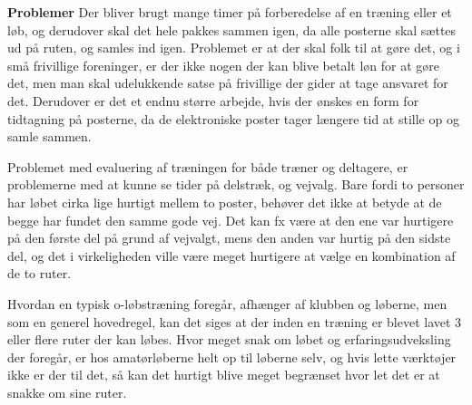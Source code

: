 \textbf{Problemer}\newline
Der bliver brugt mange timer på forberedelse af en træning eller et løb, og derudover skal det hele pakkes sammen igen, da alle posterne skal sættes ud på ruten, og samles ind igen. \newline
Problemet er at der skal folk til at gøre det, og i små frivillige foreninger, er der ikke nogen der kan blive betalt løn for at gøre det, men man skal udelukkende satse på frivillige der gider at tage ansvaret for det. \newline
Derudover er det et endnu større arbejde, hvis der ønskes en form for tidtagning på posterne, da de elektroniske poster tager længere tid at stille op og samle sammen. 

Problemet med evaluering af træningen for både træner og deltagere, er problemerne med at kunne se tider på delstræk, og vejvalg. Bare fordi to personer har løbet cirka lige hurtigt mellem to poster, behøver det ikke at betyde at de begge har fundet den samme gode vej. Det kan fx være at den ene var hurtigere på den første del på grund af vejvalgt, mens den anden var hurtig på den sidste del, og det i virkeligheden ville være meget hurtigere at vælge en kombination af de to ruter.

Hvordan en typisk o-løbstræning foregår, afhænger af klubben og løberne, men som en generel hovedregel, kan det siges at der inden en træning er blevet lavet 3 eller flere ruter der kan løbes. Hvor meget snak om løbet og erfaringsudveksling der foregår, er hos amatørløberne helt op til løberne selv, og hvis lette værktøjer ikke er der til det, så kan det hurtigt blive meget begrænset hvor let det er at snakke om sine ruter.
